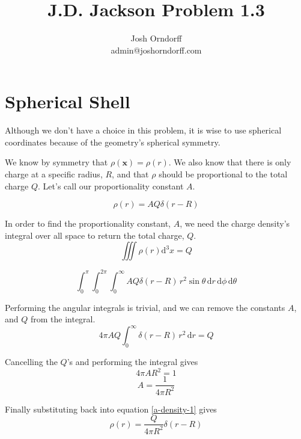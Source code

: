 \documentclass[10pt,a4paper]{article}
\begin{document}
\title{J.D. Jackson Problem 1.3}
\author{Josh Orndorff \\ admin@joshorndorff.com}
\maketitle

\section{Spherical Shell}
Although we don't have a choice in this problem, it is wise to use spherical coordinates because of the geometry's spherical symmetry.

We know by symmetry that $\rho(\mathbf{x}) = \rho(r)$. We also know that there is only charge at a specific radius, $R$, and that $\rho$ should be proportional to the total charge $Q$. Let's call our proportionality constant $A$.

\begin{equation}\label{a-density-1}
\rho(r)=AQ\delta(r-R)
\end{equation}

In order to find the proportionality constant, $A$, we need the charge density's integral over all space to return the total charge, $Q$.
\begin{equation}
\iiint\rho(r) \mathrm{d}^3x = Q
\end{equation}

\begin{equation}
\int_0^\pi \int_0^{2\pi}\int_0^\infty AQ\delta(r-R) \,r^2 \sin\theta \,\mathrm{d}r\, \mathrm{d}\phi\, \mathrm{d}\theta
\end{equation}

Performing the angular integrals is trivial, and we can remove the constants $A$, and $Q$ from the integral.
\begin{equation}
4\pi AQ\int_0^\infty \delta(r-R)\,r^2\,\mathrm{d}r =Q
\end{equation}

Cancelling the $Q$'s and performing the integral gives
\begin{equation}
4\pi AR^2=1
\end{equation}
\begin{equation}
A=\frac{1}{4\pi R^2}
\end{equation}

Finally substituting back into equation \ref{a-density-1} gives
\begin{equation}\boxed{
\rho(r) = \frac{Q}{4\pi R^2}\delta(r-R)
}\end{equation}
\end{document}
